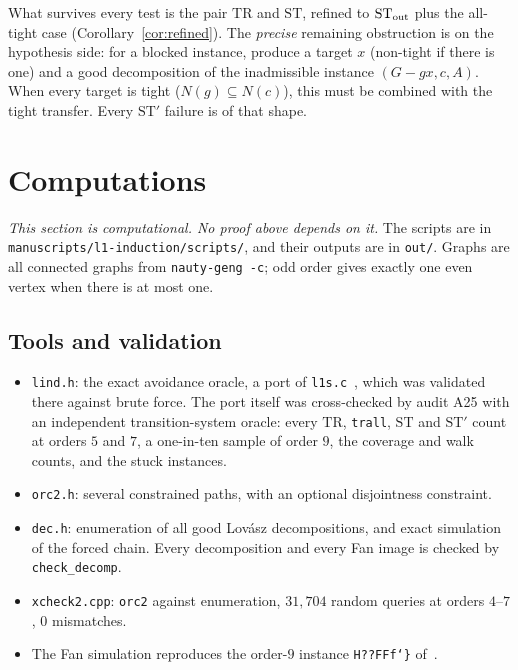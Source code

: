 \documentclass[11pt]{amsart}
\theoremstyle{definition}
\newcommand{\TR}{\mathrm{TR}}
\newcommand{\ST}{\mathrm{ST}}
\begin{document}
What survives every test is the pair $\TR$ and $\ST$, refined to $\ST_{\rm out}$ plus the all-tight
case (Corollary~\ref{cor:refined}). The \emph{precise} remaining obstruction is on the hypothesis
side: for a blocked instance, produce a target $x$ (non-tight if there is one) and a good
decomposition of the inadmissible instance $(G-gx,c,A)$. When every target is tight
($N(g)\subseteq N(c)$), this must be combined with the tight transfer. Every $\ST'$ failure is of
that shape.

\section{Computations}\label{sec:comp}

\emph{This section is computational. No proof above depends on it.} The scripts are in
\nolinkurl{manuscripts/l1-induction/scripts/}, and their outputs are in \texttt{out/}. Graphs are all
connected graphs from \texttt{nauty-geng -c}; odd order gives exactly one even vertex when there is at
most one.

\subsection*{Tools and validation}
\begin{itemize}
\item \texttt{lind.h}: the exact avoidance oracle, a port of \texttt{l1s.c}~\cite{L1S}, which was
validated there against brute force. The port itself was cross-checked by audit A25 with an
independent transition-system oracle: every $\TR$, \texttt{trall}, $\ST$ and $\ST'$ count at orders
$5$ and $7$, a one-in-ten sample of order $9$, the coverage and walk counts, and the stuck instances.
\item \texttt{orc2.h}: several constrained paths, with an optional disjointness constraint.
\item \texttt{dec.h}: enumeration of all good Lov\'asz decompositions, and exact simulation of the
forced chain. Every decomposition and every Fan image is checked by \texttt{check\_decomp}.
\item \texttt{xcheck2.cpp}: \texttt{orc2} against enumeration, $31{,}704$ random queries at orders
$4$--$7$, $0$ mismatches.
\item The Fan simulation reproduces the order-$9$ instance \texttt{H??FFf\char`\}} of~\cite{TF}.
\end{itemize}
\end{document}
